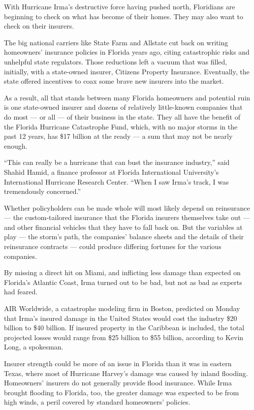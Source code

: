 With Hurricane Irma's destructive force having pushed north, Floridians
are beginning to check on what has become of their homes. They may also
want to check on their insurers.

The big national carriers like State Farm and Allstate cut back on
writing homeowners' insurance policies in Florida years ago, citing
catastrophic risks and unhelpful state regulators. Those reductions left
a vacuum that was filled, initially, with a state-owned insurer,
Citizens Property Insurance. Eventually, the state offered incentives to
coax some brave new insurers into the market.

As a result, all that stands between many Florida homeowners and
potential ruin is one state-owned insurer and dozens of relatively
little-known companies that do most --- or all --- of their business in
the state. They all have the benefit of the Florida Hurricane
Catastrophe Fund, which, with no major storms in the past 12 years, has
\$17 billion at the ready --- a sum that may not be nearly enough.

``This can really be a hurricane that can bust the insurance industry,''
said Shahid Hamid, a finance professor at Florida International
University's International Hurricane Research Center. ``When I saw
Irma's track, I was tremendously concerned.''

Whether policyholders can be made whole will most likely depend on
reinsurance --- the custom-tailored insurance that the Florida insurers
themselves take out --- and other financial vehicles that they have to
fall back on. But the variables at play --- the storm's path, the
companies' balance sheets and the details of their reinsurance contracts
--- could produce differing fortunes for the various companies.

By missing a direct hit on Miami, and inflicting less damage than
expected on Florida's Atlantic Coast, Irma turned out to be bad, but not
as bad as experts had feared.

AIR Worldwide, a catastrophe modeling firm in Boston, predicted on
Monday that Irma's insured damage in the United States would cost the
industry \$20 billion to \$40 billion. If insured property in the
Caribbean is included, the total projected losses would range from \$25
billion to \$55 billion, according to Kevin Long, a spokesman.

Insurer strength could be more of an issue in Florida than it was in
eastern Texas, where most of Hurricane Harvey's damage was caused by
inland flooding. Homeowners' insurers do not generally provide flood
insurance. While Irma brought flooding to Florida, too, the greater
damage was expected to be from high winds, a peril covered by standard
homeowners' policies.


